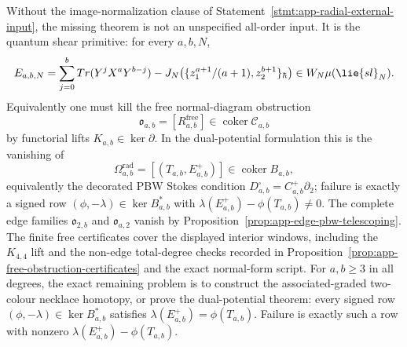 \documentclass[11pt]{memoir}
\begin{document}
\begin{thm}
  Without the image-normalization clause of
  Statement~\ref{stmt:app-radial-external-input}, the missing theorem is
  not an unspecified all-order input.  It is the quantum shear primitive:
  for every \(a,b,N\),
  \[
    E_{a,b,N}
      =
      \sum_{j=0}^b\operatorname{Tr}(Y^jX^aY^{b-j})
      -
      J_N\!\left(
        \{z_1^{a+1}/(a+1),z_2^{b+1}\}_\hbar
      \right)
      \in \mathcal W_N\widehat\mu(\lie{sl}_N).
  \]
  Equivalently one must kill the free normal-diagram obstruction
  \[
    \mathfrak o_{a,b}
      =[R^{\mathrm{free}}_{a,b}]
      \in\operatorname{coker}\mathcal C_{a,b}
  \]
  by functorial lifts \(K_{a,b}\in\ker\partial\).  In the dual-potential
  formulation this is the vanishing of
  \[
    \Omega^{\mathrm{rad}}_{a,b}
    =
    [(T_{a,b},E^+_{a,b})]\in\operatorname{coker}B_{a,b},
  \]
  equivalently the decorated PBW Stokes condition
  \(D^\square_{a,b}=C^+_{a,b}\partial_2\); failure is exactly a signed
  row \((\phi,-\lambda)\in\ker B_{a,b}^*\) with
  \(\lambda(E^+_{a,b})-\phi(T_{a,b})\ne0\).  The complete edge
  families \(\mathfrak o_{2,b}\) and \(\mathfrak o_{a,2}\) vanish by
  Proposition~\ref{prop:app-edge-pbw-telescoping}.  The finite free
  certificates cover the displayed interior windows, including the
  \(K_{4,4}\) lift and the non-edge total-degree checks recorded in
  Proposition~\ref{prop:app-free-obstruction-certificates} and the
  exact normal-form script.  For \(a,b\geq3\) in all degrees, the exact
  remaining problem is to construct the associated-graded two-colour
  necklace homotopy, or prove the dual-potential theorem: every signed
  row \((\phi,-\lambda)\in\ker B_{a,b}^*\) satisfies
  \(\lambda(E^+_{a,b})=\phi(T_{a,b})\).  Failure is exactly such a row
  with nonzero \(\lambda(E^+_{a,b})-\phi(T_{a,b})\).
\end{thm}
\end{document}
